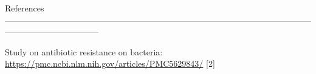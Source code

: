 \documentclass[100pt]{article}
\begin{document}
\begin{normalsize}



\end{normalsize}

\begin{normalsize}\color {bluino}
\noindent References\\
---------------------------------------------------------------------------------------------------------------------------------------------
\end{normalsize}

\begin{normalsize}

\noindent[1] Study on antibiotic resistance on bacteria: \url{https://pmc.ncbi.nlm.nih.gov/articles/PMC5629843/}
[2] 

\end{normalsize}





\end{document}

